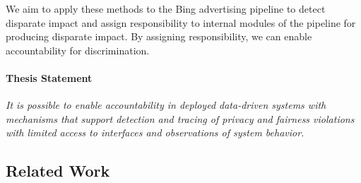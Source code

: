 \documentclass[10pt, onecolumn]{report}
\begin{document}
We aim to apply these methods to the Bing advertising pipeline to detect
disparate impact and assign responsibility to internal modules
of the pipeline for producing disparate impact. By assigning responsibility, we can 
enable accountability for discrimination. 


\paragraph{Thesis Statement}
\emph{
It is possible to enable accountability in deployed data-driven systems with 
mechanisms that support detection and tracing of privacy and fairness 
violations with limited access to interfaces and observations of system behavior.
}

%
%

\subsection*{Related Work}
\end{document}
